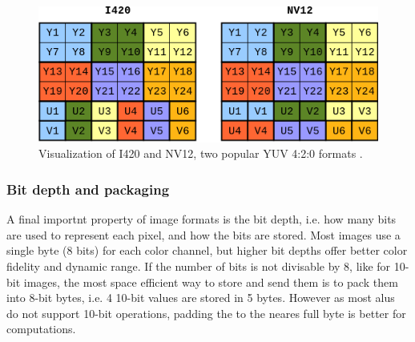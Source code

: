 \begin{figure}[H]
    \centering
    \includegraphics[width=.8\textwidth]{figures/debayer/YUV_packaging.png}
    \caption{Visualization of I420 and NV12, two popular YUV 4:2:0 formats \cite{baranYUVFormats2018}.}
    \label{fig:image_packaging}
\end{figure}

\subsubsection{Bit depth and packaging}
A final importnt property of image formats is the bit depth, i.e.
how many bits are used to represent each pixel, and how the bits are stored.
Most images use a single byte (8 bits) for each color channel, but higher bit depths offer better color fidelity and dynamic range.
If the number of bits is not divisable by 8, like for 10-bit images, the most space efficient way to store and send them is to pack them into 8-bit bytes, i.e.
4 10-bit values are stored in 5 bytes.
However as most \glspl{alu} do not support 10-bit operations, padding the to the neares full byte is better for computations.